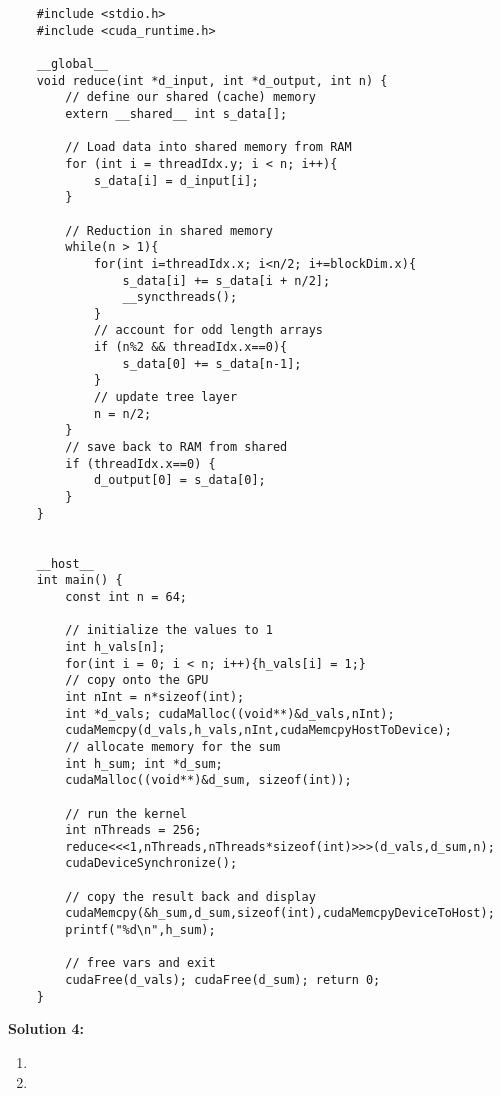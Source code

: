 \documentclass[]{article}
\begin{document}
\begin{lstlisting}
    #include <stdio.h>
    #include <cuda_runtime.h>
    
    __global__ 
    void reduce(int *d_input, int *d_output, int n) {
        // define our shared (cache) memory
        extern __shared__ int s_data[];
        
        // Load data into shared memory from RAM
        for (int i = threadIdx.y; i < n; i++){
            s_data[i] = d_input[i];
        }
    
        // Reduction in shared memory
        while(n > 1){
            for(int i=threadIdx.x; i<n/2; i+=blockDim.x){
                s_data[i] += s_data[i + n/2];
                __syncthreads();
            }
            // account for odd length arrays
            if (n%2 && threadIdx.x==0){
                s_data[0] += s_data[n-1];
            } 
            // update tree layer
            n = n/2;
        }
        // save back to RAM from shared
        if (threadIdx.x==0) {
            d_output[0] = s_data[0];
        }
    }


    __host__
    int main() {
        const int n = 64;
    
        // initialize the values to 1
        int h_vals[n];
        for(int i = 0; i < n; i++){h_vals[i] = 1;}
        // copy onto the GPU
        int nInt = n*sizeof(int);
        int *d_vals; cudaMalloc((void**)&d_vals,nInt);
        cudaMemcpy(d_vals,h_vals,nInt,cudaMemcpyHostToDevice);
        // allocate memory for the sum
        int h_sum; int *d_sum; 
        cudaMalloc((void**)&d_sum, sizeof(int));
    
        // run the kernel
        int nThreads = 256;
        reduce<<<1,nThreads,nThreads*sizeof(int)>>>(d_vals,d_sum,n);
        cudaDeviceSynchronize();
        
        // copy the result back and display
        cudaMemcpy(&h_sum,d_sum,sizeof(int),cudaMemcpyDeviceToHost);
        printf("%d\n",h_sum);
    
        // free vars and exit
        cudaFree(d_vals); cudaFree(d_sum); return 0;
    }
\end{lstlisting}

\textbf{Solution 4:}
\begin{enumerate}[label=(\alph*)]
    \item %
    \item %
\end{enumerate}
\end{document}
